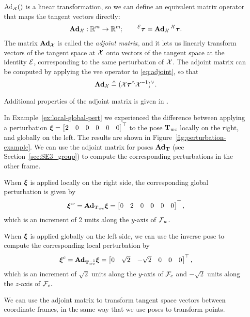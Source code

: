 $\operatorname{Ad}_{\mathcal{X}}()$ is a linear transformation, so we can define an equivalent matrix operator that maps the tangent vectors directly:
\begin{equation}
  \boldsymbol{\mathbf{Ad}}_{\mathcal{X}}: {\mathbb R}^m \to {\mathbb R}^m; \quad\quad \prescript{\mathcal{E}}{}{{\boldsymbol{\mathbf{\tau}}}} = \boldsymbol{\mathbf{Ad}}_{\mathcal{X}} \prescript{\mathcal{X}}{}{{\boldsymbol{\mathbf{\tau}}}}.
\end{equation}
The matrix $\boldsymbol{\mathbf{Ad}}_{\mathcal{X}}$ is called the \emph{adjoint matrix}, and it lets us linearly transform vectors of the tangent space at $\mathcal{X}$ onto vectors of the tangent space at the identity $\mathcal{E}$, corresponding to the same perturbation of $\mathcal{X}$.
The adjoint matrix can be computed by applying the vee operator to \eqref{eq:adjoint}, so that
\begin{equation} \label{eq:adjoint-matrix}
  \boldsymbol{\mathbf{Ad}}_{\mathcal{X}} \triangleq (\mathcal{X} {\boldsymbol{\mathbf{\tau}}}^\wedge \mathcal{X}^{-1})^\vee.
\end{equation}

Additional properties of the adjoint matrix is given in \cite{SolaARobotics, barfoot2017state}.

\begin{example}[frametitle=Computing global from local and vice versa]
In Example~\ref{ex:local-global-pert} we experienced the difference between applying a perturbation ${\boldsymbol{\mathbf{\xi}}} = \begin{bmatrix}2 & 0 & 0 & 0 & 0 & 0\end{bmatrix}^{\top}$ to the pose ${\boldsymbol{\mathbf{T}}}_{wc}$ locally on the right, and globally on the left.
The results are shown in Figure~\ref{fig:perturbation-example}.
We can use the adjoint matrix for poses $\boldsymbol{\mathbf{Ad}}_{\boldsymbol{\mathbf{T}}}$ (see Section~\ref{sec:SE3_group}) to compute the corresponding perturbations in the other frame.

When ${\boldsymbol{\mathbf{\xi}}}$ is applied locally on the right side, the corresponding global perturbation is given by
\begin{equation}
  {\boldsymbol{\mathbf{\xi}}}^w =
  \boldsymbol{\mathbf{Ad}}_{{\boldsymbol{\mathbf{T}}}_{wc}} {\boldsymbol{\mathbf{\xi}}} = 
  \begin{bmatrix} 0 & 2 & 0 & 0 & 0 & 0 \end{bmatrix}^{\top},
\end{equation}
which is an increment of 2 units along the $y$-axis of $\mathcal{F}_w$.

When ${\boldsymbol{\mathbf{\xi}}}$ is applied globally on the left side, we can use the inverse pose to compute the corresponding local perturbation by
\begin{equation}
  {\boldsymbol{\mathbf{\xi}}}^c =
  \boldsymbol{\mathbf{Ad}}_{{\boldsymbol{\mathbf{T}}}_{wc}^{-1}} {\boldsymbol{\mathbf{\xi}}} = 
  \begin{bmatrix} 0 & \sqrt{2} & -\sqrt{2} & 0 & 0 & 0 \end{bmatrix}^{\top},
\end{equation}
which is an increment of $\sqrt{2}$ units along the $y$-axis of $\mathcal{F}_c$ and $-\sqrt{2}$ units along the $z$-axis of $\mathcal{F}_c$.

We can use the adjoint matrix to transform tangent space vectors between coordinate frames, in the same way that we use poses to transform points.
\end{example}

